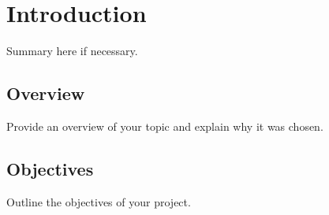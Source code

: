 \chapter{Introduction}
\label{ch:intro}

Summary here if necessary.

\section{Overview}
Provide an overview of your topic and explain why it was chosen.

\section{Objectives}
Outline the objectives of your project.